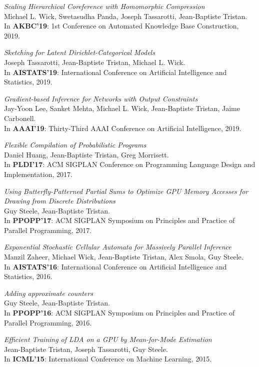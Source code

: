 \documentclass[margin,line]{res}
\begin{document}
\begin{resume}
\emph{Scaling Hierarchical Coreference with Homomorphic Compression}\\
Michael L. Wick, Swetasudha Panda, Joseph Tassarotti, Jean-Baptiste Tristan.\\
In {\bf AKBC'19}: 1st Conference on Automated Knowledge Base Construction, 2019.

\emph{Sketching for Latent Dirichlet-Categorical Models}\\
Joseph Tassarotti, Jean-Baptiste Tristan, Michael L. Wick.\\
In {\bf AISTATS'19}: International Conference on 
Artificial Intelligence and Statistics, 2019.

\emph{Gradient-based Inference for Networks with Output Constraints}\\
Jay-Yoon Lee, Sanket Mehta, Michael L. Wick, Jean-Baptiste Tristan, Jaime Carbonell.\\
In {\bf AAAI'19}: Thirty-Third AAAI Conference on Artificial Intelligence, 2019.

\emph{Flexible Compilation of Probabilistic Programs}\\
Daniel Huang, Jean-Baptiste Tristan, Greg Morrisett.\\
In {\bf PLDI'17}: ACM SIGPLAN Conference on Programming
Language Design and Implementation, 2017.

\emph{Using Butterfly-Patterned Partial Sums to Optimize GPU Memory Accesses for Drawing from Discrete Distributions}\\
Guy Steele, Jean-Baptiste Tristan.\\
In {\bf PPOPP'17}: ACM SIGPLAN Symposium on
Principles and Practice of Parallel Programming, 2017. 

\emph{Exponential Stochastic Cellular Automata for Massively Parallel Inference}\\
Manzil Zaheer, Michael Wick, Jean-Baptiste Tristan, Alex Smola, Guy Steele.\\
In {\bf AISTATS'16}: International Conference on 
Artificial Intelligence and Statistics, 2016. 

\emph{Adding approximate counters}\\
Guy Steele, Jean-Baptiste Tristan.\\
In {\bf PPOPP'16}: ACM SIGPLAN Symposium on
Principles and Practice of Parallel Programming, 2016. 

\emph{Efficient Training of LDA on a GPU by Mean-for-Mode Estimation}\\
Jean-Baptiste Tristan, Joseph Tassarotti, Guy Steele.\\
In {\bf ICML'15}: International Conference on Machine Learning, 2015. 


\end{resume}
\end{document}
